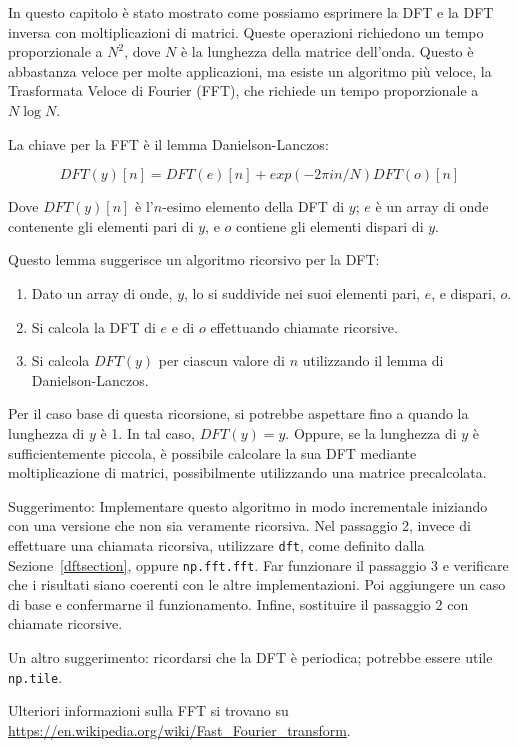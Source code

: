 \documentclass[12pt,a4paper]{book}
\begin{document}
\begin{exercise} In questo capitolo è stato mostrato come possiamo esprimere la DFT e la DFT inversa con moltiplicazioni di matrici. Queste operazioni richiedono un tempo proporzionale a $N^2$, dove $N$ è la lunghezza della matrice dell'onda. Questo è abbastanza veloce per molte applicazioni, ma esiste un algoritmo più veloce, la Trasformata Veloce di Fourier (FFT), che richiede un tempo proporzionale a $N \log N$.

La chiave per la FFT è il lemma Danielson-Lanczos:

%
\[ DFT(y)[n] = DFT(e)[n] + exp(-2 \pi i n / N) DFT(o)[n] \] 

%
Dove $ DFT(y)[n]$ è l'$n$-esimo elemento della DFT di $y$; $e$ è un array di onde contenente gli elementi pari di $y$, e $o$ contiene gli elementi dispari di $y$.

Questo lemma suggerisce un algoritmo ricorsivo per la DFT:

\begin{enumerate} 

\item Dato un array di onde, $y$, lo si suddivide nei suoi elementi pari, $e$, e dispari, $o$.

\item Si calcola la DFT di $e$ e di $o$ effettuando chiamate ricorsive.

\item Si calcola $DFT(y)$ per ciascun valore di $n$ utilizzando il lemma di Danielson-Lanczos.

\end{enumerate} 

Per il caso base di questa ricorsione, si potrebbe aspettare fino a quando la lunghezza di $y$ è 1. In tal caso, $DFT(y) = y$. Oppure, se la lunghezza di $y$ è sufficientemente piccola, è possibile calcolare la sua DFT mediante moltiplicazione di matrici, possibilmente utilizzando una matrice precalcolata.

Suggerimento: Implementare questo algoritmo in modo incrementale iniziando con una versione che non sia veramente ricorsiva. Nel passaggio 2, invece di effettuare una chiamata ricorsiva, utilizzare {\tt dft}, come definito dalla Sezione~\ref{dftsection}, oppure {\tt np.fft.fft}. Far funzionare il passaggio 3 e verificare che i risultati siano coerenti con le altre implementazioni. Poi aggiungere un caso di base e confermarne il funzionamento. Infine, sostituire il passaggio 2 con chiamate ricorsive.

Un altro suggerimento: ricordarsi che la DFT è periodica; potrebbe essere utile {\tt np.tile}.

Ulteriori informazioni sulla FFT si trovano su \url{https://en.wikipedia.org/wiki/Fast_Fourier_transform}.

\end{exercise} 
\end{document}
